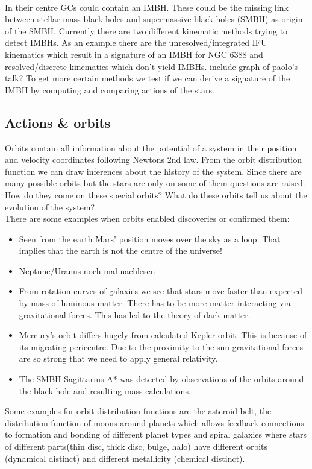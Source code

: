 \\In their centre GCs could contain an IMBH. These could be the missing link between stellar mass black holes and supermassive black holes (SMBH) as origin of the SMBH. Currently there are two different kinematic methods trying to detect IMBHs. As an example there are the unresolved/integrated IFU kinematics which result in a signature of an IMBH for NGC 6388 and resolved/discrete kinematics which don't yield IMBHs. \color{red} include graph of paolo's talk? \color{black} To get more certain methods we test if we can derive a signature of the IMBH by computing and comparing actions of the stars.


\subsection{Actions \& orbits}
Orbits contain all information about the potential of a system in their position and velocity coordinates following Newtons 2nd law. From the orbit distribution function we can draw inferences about the history of the system. Since there are many possible orbits but the stars are only on some of them questions are raised. How do they come on these special orbits? What do these orbits tell us about the evolution of the system? 
\\There are some examples when orbits enabled discoveries or confirmed them: 
\begin{itemize}
\item Seen from the earth Mars' position moves over the sky as a loop. That implies that the earth is not the centre of the universe!
\item Neptune/Uranus \color{red} noch mal nachlesen \color{black}
\item From rotation curves of galaxies we see that stars move faster than expected by mass of luminous matter. There has to be more matter interacting via gravitational forces. This has led to the theory of dark matter.
\item Mercury's orbit differs hugely from calculated Kepler orbit. This is because of its migrating pericentre. Due to the proximity to the sun gravitational forces are so strong that we need to apply general relativity.
\item The SMBH Sagittarius A*  was detected by observations of the orbits around the black hole and resulting mass calculations.
\end{itemize}
Some examples for orbit distribution functions are the asteroid belt, the distribution function of moons around planets which allows feedback connections to formation and bonding of different planet types and spiral galaxies where stars of different parts(thin disc, thick disc, bulge, halo) have different orbits (dynamical distinct) and different metallicity (chemical distinct).
